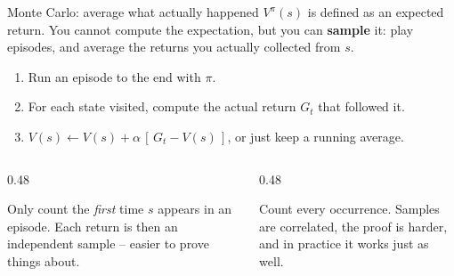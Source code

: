 \documentclass[aspectratio=169]{beamer}
\begin{document}
\begin{frame}{Monte Carlo: average what actually happened}
  \small
  $V^\pi(s)$ is defined as an expected return. You cannot compute the expectation, but you can
  \textbf{sample} it: play episodes, and average the returns you actually collected from $s$.

  \vskip 6pt
  \begin{center}
  \begin{tcolorbox}[colback=lightbg, colframe=popblue, boxrule=0.7pt, arc=2pt, width=0.82\textwidth]
    \small
    \begin{enumerate}\itemsep2pt
      \item Run an episode to the end with $\pi$.
      \item For each state visited, compute the actual return $G_t$ that followed it.
      \item $V(s) \leftarrow V(s) + \alpha\,[\,G_t - V(s)\,]$, or just keep a running average.
    \end{enumerate}
  \end{tcolorbox}
  \end{center}

  \vskip 6pt
  \begin{columns}[T]
    \begin{column}{0.48\textwidth}
      \begin{tcolorbox}[colback=armblue!8, colframe=armblue, boxrule=0.6pt, arc=2pt,
                        title={\textbf{First-visit}}]
        \small
        Only count the \emph{first} time $s$ appears in an episode. Each return is then an
        independent sample -- easier to prove things about.
      \end{tcolorbox}
    \end{column}
    \begin{column}{0.48\textwidth}
      \begin{tcolorbox}[colback=paramgreen!8, colframe=paramgreen, boxrule=0.6pt, arc=2pt,
                        title={\textbf{Every-visit}}]
        \small
        Count every occurrence. Samples are correlated, the proof is harder, and in practice it
        works just as well.
      \end{tcolorbox}
    \end{column}
  \end{columns}
\end{frame}
\end{document}

